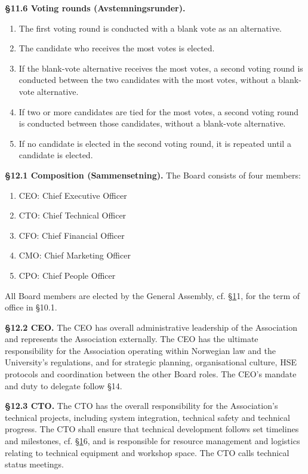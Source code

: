 \documentclass{../../../Common/Latex/Templates/rapport}
\begin{document}
\textbf{\S 11.6 Voting rounds (Avstemningsrunder).}\label{bylaw:11.6}
\begin{enumerate}
  \item The first voting round is conducted with a blank vote as an alternative.
  \item The candidate who receives the most votes is elected.
  \item If the blank-vote alternative receives the most votes, a second voting round is conducted between the two candidates with the most votes, without a blank-vote alternative.
  \item If two or more candidates are tied for the most votes, a second voting round is conducted between those candidates, without a blank-vote alternative.
  \item If no candidate is elected in the second voting round, it is repeated until a candidate is elected.
\end{enumerate}

\label{bylaw:12}
\textbf{\S 12.1 Composition (Sammensetning).}\label{bylaw:12.1} The Board consists of four members:
\begin{enumerate}
  \item CEO: Chief Executive Officer
  \item CTO: Chief Technical Officer
  \item CFO: Chief Financial Officer
  \item CMO: Chief Marketing Officer
  \item CPO: Chief People Officer
\end{enumerate}
All Board members are elected by the General Assembly, cf. \hyperref[bylaw:1]{\S 1}1, for the term of office in \S10.1.

\textbf{\S 12.2 CEO.}\label{bylaw:12.2} The CEO has overall administrative leadership of the Association and represents the Association externally. The CEO has the ultimate responsibility for the Association operating within Norwegian law and the University's regulations, and for strategic planning, organisational culture, HSE protocols and coordination between the other Board roles. The CEO's mandate and duty to delegate follow \S14.

\textbf{\S 12.3 CTO.}\label{bylaw:12.3} The CTO has the overall responsibility for the Association's technical projects, including system integration, technical safety and technical progress. The CTO shall ensure that technical development follows set timelines and milestones, cf. \hyperref[bylaw:1]{\S 1}6, and is responsible for resource management and logistics relating to technical equipment and workshop space. The CTO calls technical status meetings.
\end{document}
